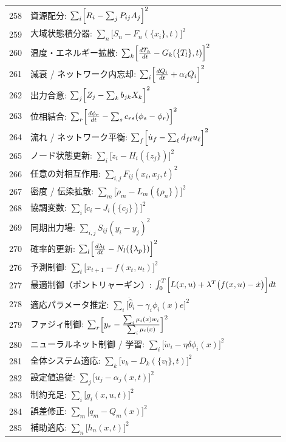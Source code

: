 \documentclass[13pt,a4paper]{ltjsarticle}
\begin{document}
\begin{longtable}{r l}
		258 & 資源配分: $\sum_i\Bigl[R_i - \sum_j P_{ij}A_j\Bigr]^2$ \\
		259 & 大域状態積分器: $\sum_n\bigl[S_n - F_n(\{x_i\},t)\bigr]^2$ \\
		260 & 温度・エネルギー拡散: $\sum_k\Bigl[\frac{dT_k}{dt} - G_k(\{T_l\},t)\Bigr]^2$ \\
		261 & 減衰 / ネットワーク内忘却: $\sum_i\Bigl[\frac{dQ_i}{dt} + \alpha_i Q_i\Bigr]^2$ \\
		262 & 出力合意: $\sum_j\Bigl[Z_j - \sum_k b_{jk}X_k\Bigr]^2$ \\
		263 & 位相結合: $\sum_r\Bigl[\frac{d\phi_r}{dt} - \sum_s c_{rs}(\phi_s-\phi_r)\Bigr]^2$ \\
		264 & 流れ / ネットワーク平衡: $\sum_f\Bigl[\dot u_f - \sum_\ell d_{f\ell}u_\ell\Bigr]^2$ \\
		265 & ノード状態更新: $\sum_i\bigl[\dot z_i - H_i(\{z_j\})\bigr]^2$ \\
		266 & 任意の対相互作用: $\sum_{i,j}F_{ij}(x_i,x_j,t)^2$ \\
		267 & 密度 / 伝染拡散: $\sum_m\bigl[\dot\rho_m - L_m(\{\rho_n\})\bigr]^2$ \\
		268 & 協調変数: $\sum_i\bigl[\dot c_i - J_i(\{c_j\})\bigr]^2$ \\
		269 & 同期出力場: $\sum_{i,j}S_{ij}(y_i-y_j)^2$ \\
		270 & 確率的更新: $\sum_l\Bigl[\frac{d\lambda_l}{dt} - N_l(\{\lambda_p\})\Bigr]^2$ \\
		276 & 予測制御: $\sum_t\bigl[x_{t+1} - f(x_t,u_t)\bigr]^2$ \\
		277 & 最適制御（ポントリャーギン）: $\int_0^T\Bigl[L(x,u) + \lambda^T\bigl(f(x,u)-\dot x\bigr)\Bigr]dt$ \\
		278 & 適応パラメータ推定: $\sum_i\bigl[\dot{\hat\theta}_i - \gamma_i\phi_i(x)e\bigr]^2$ \\
		279 & ファジィ制御: $\sum_r\Bigl[y_r - \frac{\sum_i\mu_i(x)w_i}{\sum_i\mu_i(x)}\Bigr]^2$ \\
		280 & ニューラルネット制御 / 学習: $\sum_i\bigl[\dot w_i - \eta\delta\phi_i(x)\bigr]^2$ \\
		281 & 全体システム適応: $\sum_k\bigl[\dot v_k - D_k(\{v_l\},t)\Bigr]^2$ \\
		282 & 設定値追従: $\sum_j\bigl[u_j - \alpha_j(x,t)\Bigr]^2$ \\
		283 & 制約充足: $\sum_i\bigl[g_i(x,u,t)\bigr]^2$ \\
		284 & 誤差修正: $\sum_m\bigl[q_m - Q_m(x)\bigr]^2$ \\
		285 & 補助適応: $\sum_n\bigl[h_n(x,t)\bigr]^2$ \\

\end{longtable}
\end{document}
